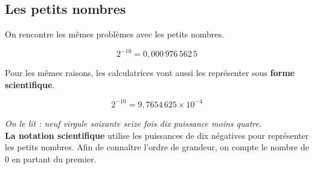 \documentclass[12pt]{article}
\begin{document}
\subsection*{Les petits nombres}
\begin{multicols}{2}



  On rencontre les mêmes problèmes avec les petits nombres.

  $$2^{-10} = 0, 000 \, 976\, 562\, 5$$

  Pour les mêmes raisons, les calculatrices vont aussi les représenter sous \textbf{forme scientifique}.

  $$2^{-10} = 9, 7654 \, 625 \times 10^{-4}$$

  \textit{On le lit : neuf virgule soixante seize fois dix puissance moins quatre.} \\
  \textbf{La notation scientifique} utilise les puissances de dix négatives pour représenter les petits nombres. Afin de connaître l'ordre de grandeur, on compte le nombre de 0 en partant du premier. \\

\end{multicols}
\end{document}
